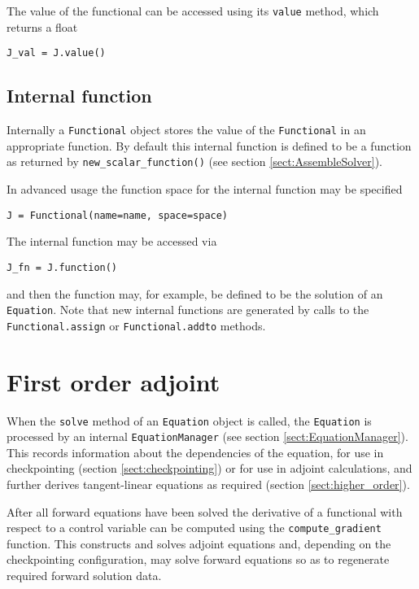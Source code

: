 \documentclass[11pt]{article}
\begin{document}
The value of the functional can be accessed using its \texttt{value} method,
which returns a float
\begin{lstlisting}
J_val = J.value()
\end{lstlisting}

\subsection{Internal function}\label{sect:Functional_internals}

Internally a \texttt{Functional} object stores the value of the
\texttt{Functional} in an appropriate function. By default this internal
function is defined to be a function as returned by
\texttt{new\_scalar\_function()} (see section \ref{sect:AssembleSolver}).

In advanced usage the function space for the internal function may be specified
\begin{lstlisting}
J = Functional(name=name, space=space)
\end{lstlisting}
The internal function may be accessed via
\begin{lstlisting}
J_fn = J.function()
\end{lstlisting}
and then the function may, for example, be defined to be the solution of an
\texttt{Equation}. Note that new internal functions are generated by calls to
the \texttt{Functional.assign} or \texttt{Functional.addto} methods.

\section{First order adjoint}\label{sect:first_order_adjoint}

When the \texttt{solve} method of an \texttt{Equation} object is called, the
\texttt{Equation} is processed by an internal \texttt{EquationManager} (see
section \ref{sect:EquationManager}). This records information about the
dependencies of the equation, for use in checkpointing (section
\ref{sect:checkpointing}) or for use in adjoint calculations, and further
derives tangent-linear equations as required (section \ref{sect:higher_order}).

After all forward equations have been solved the derivative of a functional
with respect to a control variable can be computed using the
\texttt{compute\_gradient} function. This constructs and solves adjoint
equations and, depending on the checkpointing configuration, may solve forward
equations so as to regenerate required forward solution data.
\end{document}
